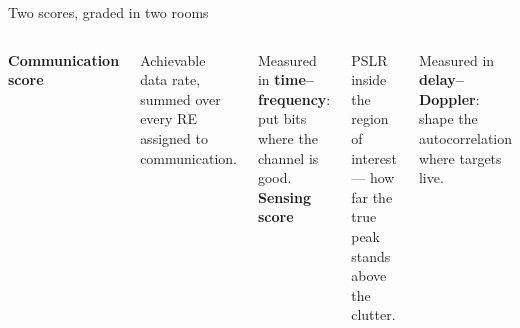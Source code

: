 \begin{frame}{Two scores, graded in two rooms}
  \vspace{0.6em}
  \begin{columns}[T,onlytextwidth]
      \large\textbf{\textcolor{ranblue}{Communication score}}

      \vspace{0.5em}
      \small
      Achievable data rate, summed over every RE assigned to communication.

      \vspace{0.5em}
      Measured in \textbf{time--frequency}: put bits where the channel is good.
      \large\textbf{\textcolor{coreorange}{Sensing score}}

      \vspace{0.5em}
      \small
      PSLR inside the region of interest --- how far the true peak stands above the clutter.

      \vspace{0.5em}
      Measured in \textbf{delay--Doppler}: shape the autocorrelation where targets live.
  \end{columns}

  \vspace{0.8em}
\end{frame}

